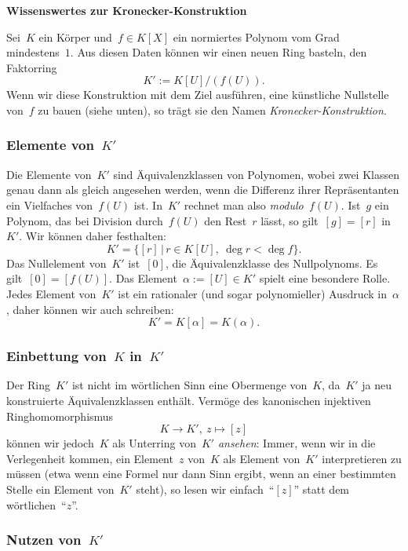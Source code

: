 \documentclass{../../alg2/algblatt}
\begin{document}
\begin{center}\Large \sffamily\textbf{Wissenswertes zur Kronecker-Konstruktion}\end{center}

Sei~$K$ ein Körper und~$f \in K[X]$ ein normiertes Polynom vom Grad
mindestens~$1$. Aus diesen Daten können wir einen neuen Ring basteln, den Faktorring
\[ K' := K[U]/(f(U)). \]
Wenn wir diese Konstruktion mit dem Ziel ausführen, eine künstliche Nullstelle
von~$f$ zu bauen (siehe unten), so trägt sie den Namen \emph{Kronecker-Konstruktion}.


\subsubsection*{Elemente von~$K'$}

Die Elemente von~$K'$ sind Äquivalenzklassen von Polynomen, wobei zwei Klassen
genau dann als gleich angesehen werden, wenn die Differenz ihrer Repräsentanten
ein Vielfaches von~$f(U)$ ist. In~$K'$ rechnet man also \emph{modulo~$f(U)$}. Ist~$g$
ein Polynom, das bei Division durch~$f(U)$ den Rest~$r$ lässt, so gilt~$[g] = [r]$
in~$K'$. Wir können daher festhalten:
\[ K' = \{ [r] \,|\, r \in K[U],\ \deg r < \deg f \}. \]
Das Nullelement von~$K'$ ist~$[0]$, die Äquivalenzklasse des Nullpolynoms. Es
gilt~$[0] = [f(U)]$. Das Element~$\alpha := [U] \in K'$ spielt eine besondere
Rolle. Jedes Element von~$K'$ ist ein rationaler (und sogar polynomieller)
Ausdruck in~$\alpha$, daher können wir auch schreiben:
\[ K' = K[\alpha] = K(\alpha). \]


\subsubsection*{Einbettung von~$K$ in~$K'$}

Der Ring~$K'$ ist nicht im wörtlichen Sinn eine Obermenge von~$K$, da~$K'$ ja
neu kon\-stru\-ier\-te Äquivalenzklassen enthält. Vermöge des kanonischen injektiven
Ringhomomorphismus
\[ K \longrightarrow K',\ z \longmapsto [z] \]
können wir jedoch~$K$ als Unterring von~$K'$ \emph{ansehen}: Immer, wenn wir in
die Verlegenheit kommen, ein Element~$z$ von~$K$ als Element von~$K'$
interpretieren zu müssen (etwa wenn eine Formel nur dann Sinn ergibt, wenn an
einer bestimmten Stelle ein Element von~$K'$ steht), so lesen wir
einfach~"`$[z]$"' statt dem wörtlichen~"`$z$"'.


\subsubsection*{Nutzen von~$K'$}
\end{document}
